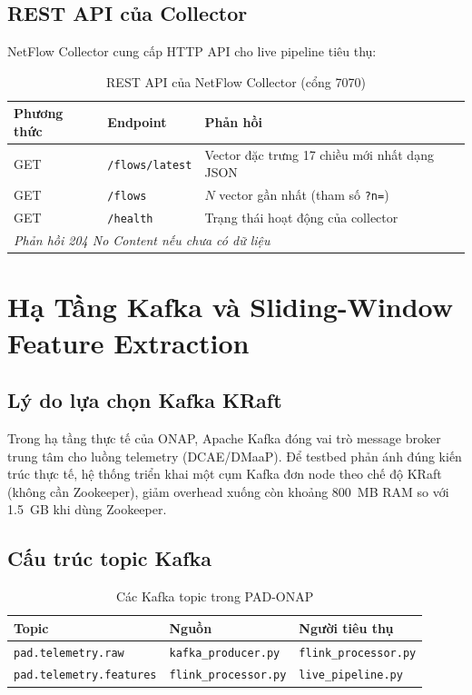 \documentclass[12pt,a4paper]{article}
\begin{document}
\subsection{REST API của Collector}

NetFlow Collector cung cấp HTTP API cho live pipeline tiêu thụ:

\begin{table}[H]
\centering
\caption{REST API của NetFlow Collector (cổng 7070)}
\label{tab:collector_api}
\begin{tabular}{llp{7.5cm}}
\toprule
\textbf{Phương thức} & \textbf{Endpoint} & \textbf{Phản hồi} \\
\midrule
GET & \texttt{/flows/latest} & Vector đặc trưng 17 chiều mới nhất dạng JSON \\
GET & \texttt{/flows}        & $N$ vector gần nhất (tham số \texttt{?n=}) \\
GET & \texttt{/health}       & Trạng thái hoạt động của collector \\
\midrule
\multicolumn{3}{l}{\textit{Phản hồi 204 No Content nếu chưa có dữ liệu}} \\
\bottomrule
\end{tabular}
\end{table}

\section{Hạ Tầng Kafka và Sliding-Window Feature Extraction}

\subsection{Lý do lựa chọn Kafka KRaft}

Trong hạ tầng thực tế của ONAP, Apache Kafka đóng vai trò message broker trung tâm cho luồng telemetry (DCAE/DMaaP). Để testbed phản ánh đúng kiến trúc thực tế, hệ thống triển khai một cụm Kafka đơn node theo chế độ KRaft (không cần Zookeeper), giảm overhead xuống còn khoảng 800~MB RAM so với 1.5~GB khi dùng Zookeeper.

\subsection{Cấu trúc topic Kafka}

\begin{table}[H]
\centering
\caption{Các Kafka topic trong PAD-ONAP}
\label{tab:kafka_topics}
\begin{tabular}{lll}
\toprule
\textbf{Topic} & \textbf{Nguồn} & \textbf{Người tiêu thụ} \\
\midrule
\texttt{pad.telemetry.raw}      & \texttt{kafka\_producer.py}  & \texttt{flink\_processor.py} \\
\texttt{pad.telemetry.features} & \texttt{flink\_processor.py} & \texttt{live\_pipeline.py} \\
\bottomrule
\end{tabular}
\end{table}
\end{document}
